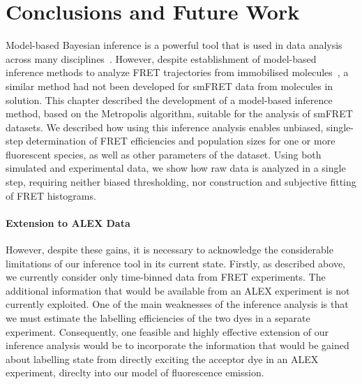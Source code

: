 \section{Conclusions and Future Work}
Model-based Bayesian inference is a powerful tool that is used in data analysis across many disciplines~\cite{mackay03}. However, despite establishment of model-based inference methods to analyze FRET trajectories from immobilised molecules~\cite{mckinney06, bronson09, bronson10, taylor10, taylor11}, a similar method had not been developed for smFRET data from molecules in solution. This chapter described the development of a model-based inference method, based on the Metropolis algorithm, suitable for the analysis of smFRET datasets. We described how using this inference analysis enables unbiased, single-step determination of FRET efficiencies and population sizes for one or more fluorescent species, as well as other parameters of the dataset. Using both simulated and experimental data, we show how raw data is analyzed in a single step, requiring neither biased thresholding, nor construction and subjective fitting of FRET histograms. 

\paragraph{Extension to ALEX Data}
However, despite these gains, it is necessary to acknowledge the considerable limitations of our inference tool in its current state. Firstly, as described above, we currently consider only time-binned data from FRET experiments. The additional information that would be available from an ALEX experiment is not currently exploited. One of the main weaknesses of the inference analysis is that we must estimate the labelling efficiencies of the two dyes in a separate experiment. Consequently, one feasible and highly effective extension of our inference analysis would be to incorporate the information that would be gained about labelling state from directly exciting the acceptor dye in an ALEX experiment, direclty into our model of fluorescence emission. 

